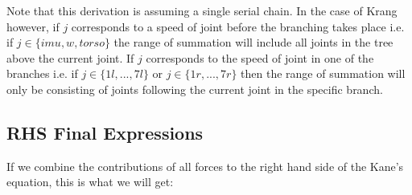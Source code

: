 \documentclass[a4paper,10pt]{article}
\begin{document}
Note that this derivation is assuming a single serial chain. In the case of Krang however, if $j$ corresponds to a 
speed of joint before the branching takes place i.e. if $j \in \{ imu, w, torso \}$ the range of summation will include
all joints in the tree above the current joint. If $j$ corresponds to the speed of joint in one of the branches
i.e. if $j \in \{ 1l, ... , 7l \}$ or $j \in \{ 1r, ... , 7r \}$ then the range of summation will only be consisting
of joints following the current joint in the specific branch.

\subsection{RHS Final Expressions}
If we combine the contributions of all forces to the right hand side of the Kane's equation, this is what we will get:
\end{document}
